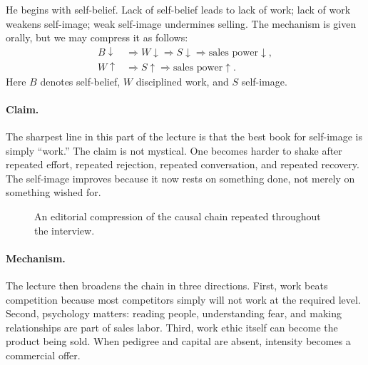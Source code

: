 He begins with self-belief. Lack of self-belief leads to lack of work; lack of work weakens self-image; weak self-image undermines selling. The mechanism is given orally, but we may compress it as follows:
\begin{align}
B \downarrow &\Longrightarrow W \downarrow \Longrightarrow S \downarrow \Longrightarrow \text{sales power} \downarrow,\\
W \uparrow &\Longrightarrow S \uparrow \Longrightarrow \text{sales power} \uparrow.
\end{align}
Here \(B\) denotes self-belief, \(W\) disciplined work, and \(S\) self-image.

\paragraph{Claim.}
The sharpest line in this part of the lecture is that the best book for self-image is simply ``work.'' The claim is not mystical. One becomes harder to shake after repeated effort, repeated rejection, repeated conversation, and repeated recovery. The self-image improves because it now rests on something done, not merely on something wished for.

\begin{figure}[h]
\centering
{}
\caption{An editorial compression of the causal chain repeated throughout the interview.}
\end{figure}

\paragraph{Mechanism.}
The lecture then broadens the chain in three directions. First, work beats competition because most competitors simply will not work at the required level. Second, psychology matters: reading people, understanding fear, and making relationships are part of sales labor. Third, work ethic itself can become the product being sold. When pedigree and capital are absent, intensity becomes a commercial offer.

